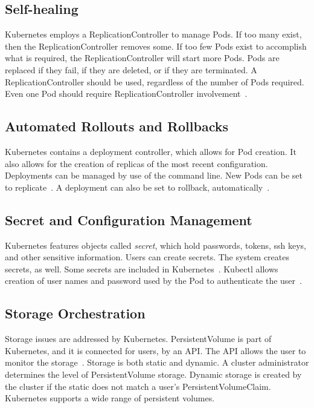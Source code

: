 \subsection{Self-healing}

Kubernetes employs a ReplicationController to manage Pods.  If too
many exist, then the ReplicationController removes some.  If too few
Pods exist to accomplish what is required, the ReplicationController
will start more Pods.  Pods are replaced if they fail, if they are
deleted, or if they are terminated.  A ReplicationController should be
used, regardless of the number of Pods required.  Even one Pod should
require ReplicationController involvement~\cite{concept}.


\subsection{Automated Rollouts and Rollbacks}

Kubernetes contains a deployment controller, which allows for Pod
creation.  It also allows for the creation of replicas of the most
recent configuration.  Deployments can be managed by use of the
command line.  New Pods can be set to replicate~\cite{concept}. A
deployment can also be set to rollback, automatically~\cite{concept}.  

\subsection{Secret and Configuration Management}

Kubernetes features objects called \emph{secret}, which hold passwords,
tokens, ssh keys, and other sensitive information.  Users can create
secrets.  The system creates secrets, as well.  Some secrets are
included in Kubernetes~\cite{concept}.  Kubectl allows creation of
user names and password used by the Pod to authenticate the  
user~\cite{concept}.  

\subsection{Storage Orchestration}

Storage issues are addressed by Kubernetes.  PersistentVolume is part
of Kubernetes, and it is connected for users, by an API.  The API
allows the user to monitor the storage~\cite{concept}.  Storage is
both static and dynamic.  A cluster administrator determines the level
of PersistentVolume storage.  Dynamic storage is created by the
cluster if the static does not match a user's PersistentVolumeClaim.
Kubernetes supports a wide range of persistent volumes.    


